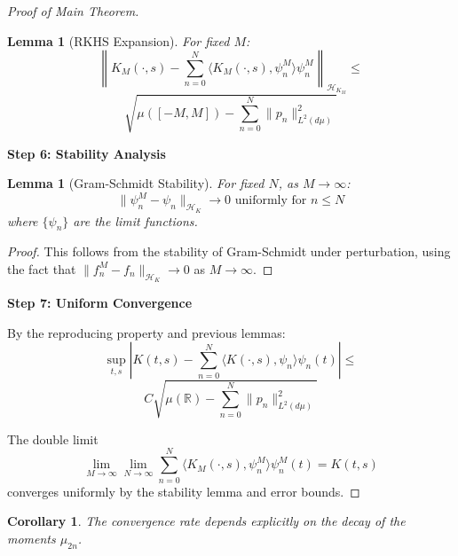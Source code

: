 \documentclass{article}
\newtheorem{lemma}[theorem]{Lemma}
\newtheorem{corollary}[theorem]{Corollary}
\begin{document}
\begin{proof}[Proof of Main Theorem]
\begin{lemma}[RKHS Expansion]
For fixed $M$:
\[ \left\|K_M(\cdot,s) - \sum_{n=0}^N \langle K_M(\cdot,s), \psi_n^M \rangle \psi_n^M\right\|_{\mathcal{H}_{K_M}} \leq \]
\[ \sqrt{\mu([-M,M]) - \sum_{n=0}^N \|p_n\|^2_{L^2(d\mu)}} \]
\end{lemma}

\textbf{Step 6: Stability Analysis}

\begin{lemma}[Gram-Schmidt Stability]
For fixed $N$, as $M \to \infty$:
\[ \|\psi_n^M - \psi_n\|_{\mathcal{H}_K} \to 0 \text{ uniformly for } n \leq N \]
where $\{\psi_n\}$ are the limit functions.
\end{lemma}

\begin{proof}
This follows from the stability of Gram-Schmidt under perturbation, using the fact that $\|f_n^M - f_n\|_{\mathcal{H}_K} \to 0$ as $M \to \infty$.
\end{proof}

\textbf{Step 7: Uniform Convergence}

By the reproducing property and previous lemmas:
\[ \sup_{t,s} \left|K(t,s) - \sum_{n=0}^N \langle K(\cdot,s), \psi_n \rangle \psi_n(t)\right| \leq \]
\[ C\sqrt{\mu(\mathbb{R}) - \sum_{n=0}^N \|p_n\|^2_{L^2(d\mu)}} \]

The double limit
\[ \lim_{M \to \infty} \lim_{N \to \infty} \sum_{n=0}^N \langle K_M(\cdot,s), \psi_n^M \rangle \psi_n^M(t) = K(t,s) \]
converges uniformly by the stability lemma and error bounds.
\end{proof}

\begin{corollary}
The convergence rate depends explicitly on the decay of the moments $\mu_{2n}$.
\end{corollary}
\end{document}
